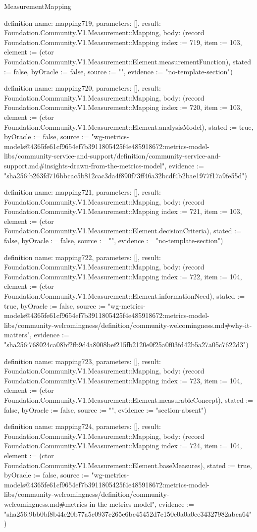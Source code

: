\begin{lexlean}{MeasurementMapping}
\begin{semanticmodule}
definition{
  name: mapping719,
  parameters: [],
  result: Foundation.Community.V1.Measurement::Mapping,
  body: (record Foundation.Community.V1.Measurement::Mapping {index := 719, item := 103, element := (ctor Foundation.Community.V1.Measurement::Element.measurementFunction), stated := false, byOracle := false, source := "", evidence := "no-template-section"})
}

definition{
  name: mapping720,
  parameters: [],
  result: Foundation.Community.V1.Measurement::Mapping,
  body: (record Foundation.Community.V1.Measurement::Mapping {index := 720, item := 103, element := (ctor Foundation.Community.V1.Measurement::Element.analysisModel), stated := true, byOracle := false, source := "wg-metrics-models@4365fe61cf9654ef7b3911805425f4e485918672:metrics-model-libs/community-service-and-support/definition/community-service-and-support.md#insights-drawn-from-the-metrics-model", evidence := "sha256:b263fd716bbcac5b812cac3da4f890f73ff46a32bcdf4b2bae1977f17a9fe55d"})
}

definition{
  name: mapping721,
  parameters: [],
  result: Foundation.Community.V1.Measurement::Mapping,
  body: (record Foundation.Community.V1.Measurement::Mapping {index := 721, item := 103, element := (ctor Foundation.Community.V1.Measurement::Element.decisionCriteria), stated := false, byOracle := false, source := "", evidence := "no-template-section"})
}

definition{
  name: mapping722,
  parameters: [],
  result: Foundation.Community.V1.Measurement::Mapping,
  body: (record Foundation.Community.V1.Measurement::Mapping {index := 722, item := 104, element := (ctor Foundation.Community.V1.Measurement::Element.informationNeed), stated := true, byOracle := false, source := "wg-metrics-models@4365fe61cf9654ef7b3911805425f4e485918672:metrics-model-libs/community-welcomingness/definition/community-welcomingness.md#why-it-matters", evidence := "sha256:768024ca08bf2fb9d4a8008bef215fb2120e0f25a0f03fd42b5a27a05c7622d3"})
}

definition{
  name: mapping723,
  parameters: [],
  result: Foundation.Community.V1.Measurement::Mapping,
  body: (record Foundation.Community.V1.Measurement::Mapping {index := 723, item := 104, element := (ctor Foundation.Community.V1.Measurement::Element.measurableConcept), stated := false, byOracle := false, source := "", evidence := "section-absent"})
}

definition{
  name: mapping724,
  parameters: [],
  result: Foundation.Community.V1.Measurement::Mapping,
  body: (record Foundation.Community.V1.Measurement::Mapping {index := 724, item := 104, element := (ctor Foundation.Community.V1.Measurement::Element.baseMeasures), stated := true, byOracle := false, source := "wg-metrics-models@4365fe61cf9654ef7b3911805425f4e485918672:metrics-model-libs/community-welcomingness/definition/community-welcomingness.md#metrics-in-the-metrics-model", evidence := "sha256:9bb0bf8b44e20b77a5c0937c265e6bc45452d7c150e0a0a0ee34327982abca64"})
}


\end{semanticmodule}
\end{lexlean}
